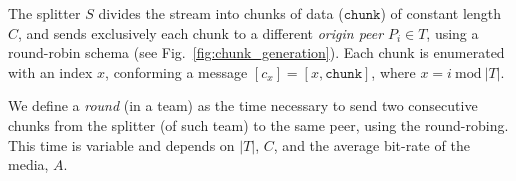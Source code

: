 \label{sec:chunk_generation}
\begin{figure*}
  \caption{Chunk generation at the splitter.\label{fig:chunk_generation}}
\end{figure*}
The splitter $S$ divides the stream into chunks of data
($\mathtt{chunk}$) of constant length $C$, and sends exclusively each
chunk to a different \emph{origin peer} $P_i\in T$, using a
round-robin schema (see Fig.~\ref{fig:chunk_generation}). Each chunk
is enumerated with an index $x$, conforming a message
$[c_x]=[x,\mathtt{chunk}]$, where $x=i~\mathrm{mod}~|T|$.

We define a \emph{round} (in a team) as the time necessary to send two
consecutive chunks from the splitter (of such team) to the same peer,
using the round-robing. This time is variable and depends on $|T|$,
$C$, and the average bit-rate of the media, $A$.

\begin{comment}
The round-time is defined by:
\begin{equation}
  \cal{r} = \cal{c}N.
  \label{eq:round_time}
\end{equation}
For example, if we use only one team of $N=256$ peers, a chunk size
$C=1024$~bytes, and a video of $1$~Mb/s, the round time is
\begin{displaymath}
  \cal{r} = \frac{1024\frac{\text{bytes}}{\text{chunk}}\times
    8\frac{\text{bits}}{\text{byte}}}{10^6\frac{\text{bits}}{\text{second}}}\times
  256 \approx 2.1~\text{seconds}.
\end{displaymath}
\end{comment}
